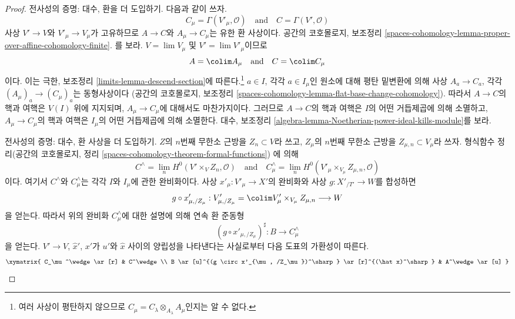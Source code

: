 \begin{proof}
\medskip\noindent
전사성의 증명: 대수, 환을 더 도입하기.
다음과 같이 쓰자.
$$
C_\mu = \Gamma(V'_\mu, \mathcal{O})
\quad\text{and}\quad
C = \Gamma(V', \mathcal{O})
$$
사상 $V' \to V$와 $V'_\mu \to V_\mu$가 고유하므로
$A \to C$와 $A_\mu \to C_\mu$는 유한 환 사상이다.
공간의 코호몰로지, 보조정리
\ref{spaces-cohomology-lemma-proper-over-affine-cohomology-finite}.
를 보라. $V = \lim V_\mu$ 및 $V' = \lim V'_\mu$이므로
$$
A = \colim A_\mu
\quad\text{and}\quad
C = \colim C_\mu
$$
이다. 이는 극한, 보조정리
\ref{limits-lemma-descend-section}에 따른다.\footnote{여러 사상이
평탄하지 않으므로 $C_\mu = C_\lambda \otimes_{A_\lambda} A_\mu$인지는
알 수 없다.} $a \in I$, 각각 $a \in I_\mu$인 원소에 대해
평탄 밑변환에 의해 사상 $A_a \to C_a$, 각각
$(A_\mu)_a \to (C_\mu)_a$는 동형사상이다
(공간의 코호몰로지, 보조정리
\ref{spaces-cohomology-lemma-flat-base-change-cohomology}).
따라서 $A \to C$의 핵과 여핵은 $V(I)$ 위에 지지되며,
$A_\mu \to C_\mu$에 대해서도 마찬가지이다.
그러므로 $A \to C$의 핵과 여핵은 $I$의 어떤 거듭제곱에 의해 소멸하고,
$A_\mu \to C_\mu$의 핵과 여핵은 $I_\mu$의 어떤 거듭제곱에 의해 소멸한다.
대수, 보조정리 \ref{algebra-lemma-Noetherian-power-ideal-kills-module}를 보라.

\medskip\noindent
전사성의 증명: 대수, 환 사상을 더 도입하기.
$Z$의 $n$번째 무한소 근방을 $Z_n \subset V$라 쓰고,
$Z_\mu$의 $n$번째 무한소 근방을
$Z_{\mu, n} \subset V_\mu$라 쓰자.
형식함수 정리(공간의 코호몰로지, 정리
\ref{spaces-cohomology-theorem-formal-functions})
에 의해
$$
C^\wedge = \lim_n H^0(V' \times_V Z_n, \mathcal{O})
\quad\text{and}\quad
C_\mu^\wedge =
\lim_n H^0(V'_\mu \times_{V_\mu} Z_{\mu, n}, \mathcal{O})
$$
이다. 여기서 $C^\wedge$와 $C_\mu^\wedge$는 각각
$I$와 $I_\mu$에 관한 완비화이다.
사상 $x'_\mu : V'_\mu \to X'$의 완비화와 사상
$g : X'_{/T'} \to W$를 합성하면
$$
g \circ x'_{\mu, /Z_\mu} :
V'_{\mu, /Z_\mu} = \colim V_\mu' \times_{V_\mu} Z_{\mu, n}
\longrightarrow
W
$$
을 얻는다. 따라서 위의 완비화 $C_\mu^\wedge$에 대한 설명에 의해
연속 환 준동형
$$
(g \circ x'_{\mu, /Z_\mu})^\sharp : B \longrightarrow C_\mu^\wedge
$$
을 얻는다.
$V' \to V$, $\hat x'$, $x'$가 $u'$와 $\hat x$ 사이의 양립성을
나타낸다는 사실로부터 다음 도표의 가환성이 따른다.
$$
\xymatrix{
C_\mu^\wedge \ar[r] &
C^\wedge \\
B \ar[u]^{(g \circ x'_{\mu, /Z_\mu})^\sharp} \ar[r]^{(\hat x)^\sharp} &
A^\wedge \ar[u]
}
$$


\end{proof}
